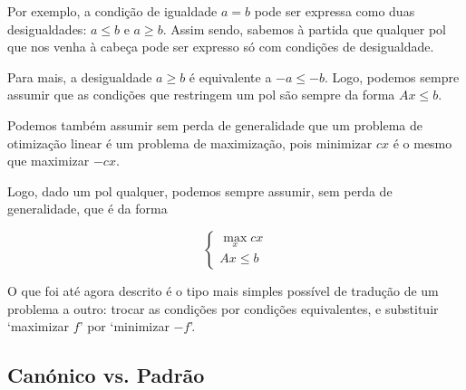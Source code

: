 \documentclass{article}
\theoremstyle{definition}
\begin{document}
	Por exemplo, a condição de igualdade $a = b$ pode ser expressa como duas desigualdades: $a \leq b$ e $a \geq b$. Assim sendo, sabemos à partida que qualquer pol que nos venha à cabeça pode ser expresso só com condições de desigualdade.
	
	Para mais, a desigualdade $a \geq b$ é equivalente a $-a \leq -b$. Logo, podemos sempre assumir que as condições que restringem um pol são sempre da forma $Ax \leq b$.
	
	Podemos também assumir sem perda de generalidade que um problema de otimização linear é um problema de maximização, pois minimizar $cx$ é o mesmo que maximizar $-cx$.
	
	Logo, dado um pol qualquer, podemos sempre assumir, sem perda de generalidade, que é da forma
	
	\[
	\begin{cases}
	\max\limits_x cx\\
	Ax \leq b
	\end{cases}
	\]
	
	O que foi até agora descrito é o tipo mais simples possível de tradução de um problema a outro: trocar as condições por condições equivalentes, e substituir `maximizar $f$' por `minimizar $-f$'.
	
	\subsection{Canónico vs. Padrão}
	
	
\end{document}
